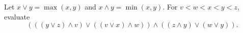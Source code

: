 Let $x\lor y=\max(x,y)$ and $x\land y=\min(x,y)$. For $v<w<x<y<z$, evaluate
\[
(((y\lor z)\land v)\lor((v\lor x)\land w))\land((z\land y)\lor(w\lor y)).
\]
